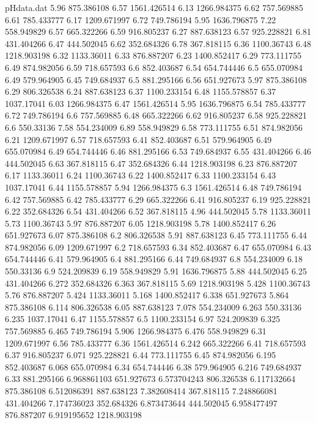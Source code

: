 \begin{filecontents}{pHdata.dat}
5.96	875.386108
6.57	1561.426514
6.13	1266.984375
6.62	757.569885
6.61	785.433777
6.17	1209.671997
6.72	749.786194
5.95	1636.796875
7.22	558.949829
6.57	665.322266
6.59	916.805237
6.27	887.638123
6.57	925.228821
6.81	431.404266
6.47	444.502045
6.62	352.684326
6.78	367.818115
6.36	1100.36743
6.48	1218.903198
6.32	1133.36011
6.33	876.887207
6.23	1400.852417
6.29	773.111755
6.49	874.982056
6.59	718.657593
6.6	852.403687
6.54	654.744446
6.5	655.070984
6.49	579.964905
6.45	749.684937
6.5	881.295166
6.56	651.927673
5.97	875.386108
6.29	806.326538
6.24	887.638123
6.37	1100.233154
6.48	1155.578857
6.37	1037.17041
6.03	1266.984375
6.47	1561.426514
5.95	1636.796875
6.54	785.433777
6.72	749.786194
6.6	757.569885
6.48	665.322266
6.62	916.805237
6.58	925.228821
6.6	550.33136
7.58	554.234009
6.89	558.949829
6.58	773.111755
6.51	874.982056
6.21	1209.671997
6.57	718.657593
6.41	852.403687
6.51	579.964905
6.49	655.070984
6.49	654.744446
6.46	881.295166
6.53	749.684937
6.55	431.404266
6.46	444.502045
6.63	367.818115
6.47	352.684326
6.44	1218.903198
6.23	876.887207
6.17	1133.36011
6.24	1100.36743
6.22	1400.852417
6.33	1100.233154
6.43	1037.17041
6.44	1155.578857
5.94	1266.984375
6.3	1561.426514
6.48	749.786194
6.42	757.569885
6.42	785.433777
6.29	665.322266
6.41	916.805237
6.19	925.228821
6.22	352.684326
6.54	431.404266
6.52	367.818115
4.96	444.502045
5.78	1133.36011
5.73	1100.36743
5.97	876.887207
6.05	1218.903198
5.78	1400.852417
6.26	651.927673
6.07	875.386108
6.2	806.326538
5.91	887.638123
6.45	773.111755
6.44	874.982056
6.09	1209.671997
6.2	718.657593
6.34	852.403687
6.47	655.070984
6.43	654.744446
6.41	579.964905
6.4	881.295166
6.44	749.684937
6.8	554.234009
6.18	550.33136
6.9	524.209839
6.19	558.949829
5.91	1636.796875
5.88	444.502045
6.25	431.404266
6.272	352.684326
6.363	367.818115
5.69	1218.903198
5.428	1100.36743
5.76	876.887207
5.424	1133.36011
5.168	1400.852417
6.338	651.927673
5.864	875.386108
6.114	806.326538
6.05	887.638123
7.078	554.234009
6.263	550.33136
6.235	1037.17041
6.47	1155.578857
6.5	1100.233154
6.97	524.209839
6.325	757.569885
6.465	749.786194
5.906	1266.984375
6.476	558.949829
6.31	1209.671997
6.56	785.433777
6.36	1561.426514
6.242	665.322266
6.41	718.657593
6.37	916.805237
6.071	925.228821
6.44	773.111755
6.45	874.982056
6.195	852.403687
6.068	655.070984
6.34	654.744446
6.38	579.964905
6.216	749.684937
6.33	881.295166
6.968861103	651.927673
6.573704243	806.326538
6.117132664	875.386108
6.512086391	887.638123
7.382608414	367.818115
7.248866081	431.404266
7.174736023	352.684326
6.873473644	444.502045
6.958477497	876.887207
6.919195652	1218.903198

\end{filecontents}
